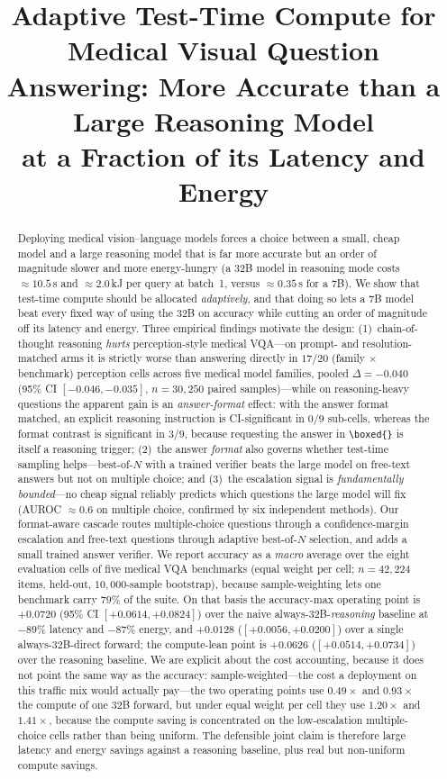 \documentclass[conference]{IEEEtran}
\title{Adaptive Test-Time Compute for Medical Visual Question\\Answering: More Accurate than a Large Reasoning Model\\at a Fraction of its Latency and Energy}
\author{\IEEEauthorblockN{Anonymous Authors}
\IEEEauthorblockA{\textit{Submitted to CVGIP 2026}\\
\textit{All reported figures are computed from measured model outputs; none are fabricated.}}}
\begin{document}
\maketitle

\begin{abstract}
Deploying medical vision--language models forces a choice between a small, cheap model and a large reasoning model that is far more accurate but an order of magnitude slower and more energy-hungry (a 32B model in reasoning mode costs ${\approx}10.5$\,s and ${\approx}2.0$\,kJ per query at batch~1, versus ${\approx}0.35$\,s for a 7B). We show that test-time compute should be allocated \emph{adaptively}, and that doing so lets a 7B model beat every fixed way of using the 32B on accuracy while cutting an order of magnitude off its latency and energy. Three empirical findings motivate the design: (1)~chain-of-thought reasoning \emph{hurts} perception-style medical VQA---on prompt- and resolution-matched arms it is strictly worse than answering directly in $17/20$ (family $\times$ benchmark) perception cells across five medical model families, pooled $\Delta{=}-0.040$ (95\% CI $[-0.046,-0.035]$, $n{=}30{,}250$ paired samples)---while on reasoning-heavy questions the apparent gain is an \emph{answer-format} effect: with the answer format matched, an explicit reasoning instruction is CI-significant in $0/9$ sub-cells, whereas the format contrast is significant in $3/9$, because requesting the answer in \texttt{\textbackslash boxed\{\}} is itself a reasoning trigger; (2)~the answer \emph{format} also governs whether test-time sampling helps---best-of-$N$ with a trained verifier beats the large model on free-text answers but not on multiple choice; and (3)~the escalation signal is \emph{fundamentally bounded}---no cheap signal reliably predicts which questions the large model will fix (AUROC ${\approx}0.6$ on multiple choice, confirmed by six independent methods). Our format-aware cascade routes multiple-choice questions through a confidence-margin escalation and free-text questions through adaptive best-of-$N$ selection, and adds a small trained answer verifier. We report accuracy as a \emph{macro} average over the eight evaluation cells of five medical VQA benchmarks (equal weight per cell; $n{=}42{,}224$ items, held-out, $10{,}000$-sample bootstrap), because sample-weighting lets one benchmark carry $79\%$ of the suite. On that basis the accuracy-max operating point is $+0.0720$ (95\% CI $[+0.0614,+0.0824]$) over the naive always-32B-\emph{reasoning} baseline at ${-}89\%$ latency and ${-}87\%$ energy, and $+0.0128$ ($[+0.0056,+0.0200]$) over a single always-32B-direct forward; the compute-lean point is $+0.0626$ ($[+0.0514,+0.0734]$) over the reasoning baseline. We are explicit about the cost accounting, because it does not point the same way as the accuracy: sample-weighted---the cost a deployment on this traffic mix would actually pay---the two operating points use $0.49{\times}$ and $0.93{\times}$ the compute of one 32B forward, but under equal weight per cell they use $1.20{\times}$ and $1.41{\times}$, because the compute saving is concentrated on the low-escalation multiple-choice cells rather than being uniform. The defensible joint claim is therefore large latency and energy savings against a reasoning baseline, plus real but non-uniform compute savings.

\end{abstract}
\end{document}
